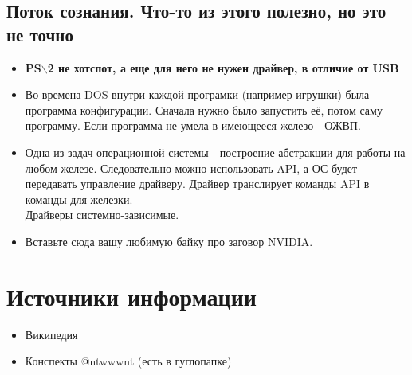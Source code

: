 \documentclass[12pt, a4paper]{article}
\begin{document}
\subsection{Поток сознания. Что-то из этого полезно, но это не точно}
\begin{itemize}
\item \textbf{PS$\backslash$2 не хотспот, а еще для него не нужен драйвер, в отличие от USB}
\item Во времена DOS внутри каждой програмки (например игрушки) была программа конфигурации. Сначала нужно было запустить её, потом саму программу. Если программа не умела в имеющееся железо - ОЖВП.
\item Одна из задач операционной системы - построение абстракции для работы на любом железе. Следовательно можно использовать API, а ОС будет передавать управление драйверу. Драйвер транслирует команды API в команды для железки.\\
Драйверы системно-зависимые.
\item Вставьте сюда вашу любимую байку про заговор NVIDIA.
\end{itemize}
\section{Источники информации}
\begin{itemize}
    \item Википедия
    \item Конспекты @ntwwwnt (есть в гуглопапке)
\end{itemize}
\end{document}
